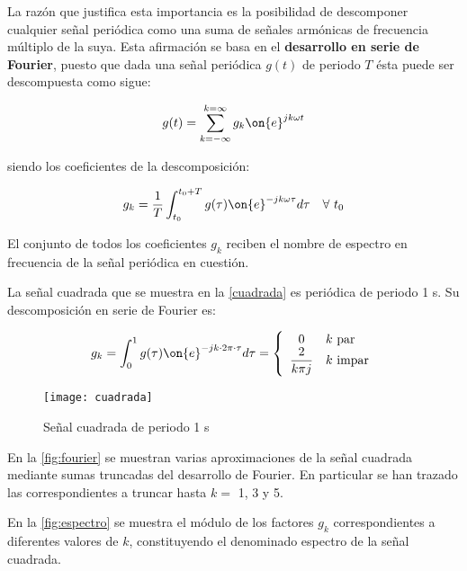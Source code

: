 La razón que justifica esta importancia es la posibilidad de descomponer cualquier señal periódica
como una suma de señales armónicas de frecuencia múltiplo de la suya. Esta afirmación se basa en el
\textbf{desarrollo en serie de Fourier}, puesto que dada una señal periódica $g(t)$ de periodo $T$
ésta puede ser descompuesta como sigue:

\begin{equation*}
	g(t) = \sum_{k=-\infty }^{k=\infty }g_{k}\on{e}^{jk\omega t} 
\end{equation*}

siendo los coeficientes de la descomposición:

\begin{equation}
	g_{k} = \dfrac{1}{T}\int _{t_0}^{t_0+T} g(\tau)\on{e}^{-jk\omega \tau } d\tau
		\quad \forall \ t_0 \label{SerieFourier}
\end{equation}

El conjunto de todos los coeficientes $g_{k}$ reciben el nombre de espectro en frecuencia de la señal
periódica en cuestión.


\begin{ejemplo}

La señal cuadrada que se muestra en la \autoref{cuadrada} es periódica de periodo 1 s. Su
descomposición en serie de Fourier es:

\[
	g_k = \int_0^1 g(\tau)\on{e}^{-jk\cdot 2\pi\cdot \tau} d\tau = 
	\left\{
	\begin{array}{cl}
		 0 & k \text{ par}\\
		\dfrac{2}{k\pi j} & k \text{ impar} 
	\end{array}
	\right.
\]

\ifEPUB
\else
	\begin{figure}[htbp]\centering
		\texttt{[image: cuadrada]}
		\caption{Señal cuadrada de periodo 1 s}
		\label{cuadrada}
		\bigskip
	\end{figure}
\fi

En la \autoref{fig:fourier} se muestran varias aproximaciones de la señal cuadrada mediante
sumas truncadas del desarrollo de Fourier. En particular se han trazado las correspondientes a
truncar hasta $k=$ 1, 3 y 5.

En la \autoref{fig:espectro} se muestra el módulo de los factores $g_k$ correspondientes a diferentes
valores de $k$, constituyendo el denominado espectro de la señal cuadrada.

\end{ejemplo}

